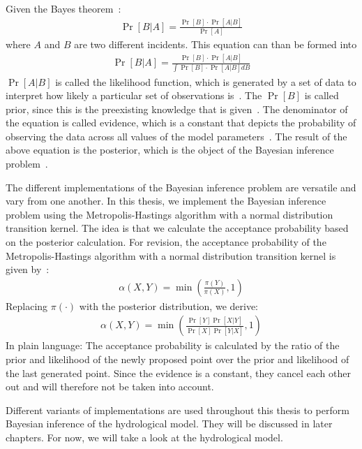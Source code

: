Given the Bayes theorem~\cite{SatzBayes}:
\begin{align}
    \Pr[B|A] = \frac{\Pr[B]\cdot\Pr[A|B]}{\Pr[A]}
\end{align}
where $A$ and $B$ are two different incidents. This equation can than be formed into
\begin{align}
    \Pr[B|A] = \frac{\Pr[B]\cdot\Pr[A|B]}{\int\Pr[B]\cdot\Pr[A|B]dB}
\end{align}
$\Pr[A|B]$ is called the likelihood function, which is generated by a set of data to interpret how likely a particular set of observations is~\cite{likelihood_idea}. The $\Pr[B]$ is called prior, since this is the preexisting knowledge that is given~\cite{prior}. The denominator of the equation is called evidence, which is a constant that depicts the probability of observing the data across all values of the model parameters~\cite{mcmc_practice}. The result of the above equation is the posterior, which is the object of the Bayesian inference problem~\cite{mcmc_practice}.

The different implementations of the Bayesian inference problem are versatile and vary from one another. In this thesis, we implement the Bayesian inference problem using the Metropolis-Hastings algorithm with a normal distribution transition kernel. The idea is that we calculate the acceptance probability based on the posterior calculation. For revision, the acceptance probability of the Metropolis-Hastings algorithm with a normal distribution transition kernel is given by~\cite{mcmc_practice}:
\begin{align}
    \alpha(X, Y) = \min (\frac{\pi(Y)}{\pi(X)}, 1)
\end{align}
Replacing $\pi(\cdot)$ with the posterior distribution, we derive:
\begin{align}
    \alpha(X, Y) = \min (\frac{\Pr[Y]\Pr[X|Y]}{\Pr[X]\Pr[Y|X]}, 1)
\end{align}
In plain language: The acceptance probability is calculated by the ratio of the prior and likelihood of the newly proposed point over the prior and likelihood of the last generated point. Since the evidence is a constant, they cancel each other out and will therefore not be taken into account.

Different variants of implementations are used throughout this thesis to perform Bayesian inference of the hydrological model. They will be discussed in later chapters. For now, we will take a look at the hydrological model.





